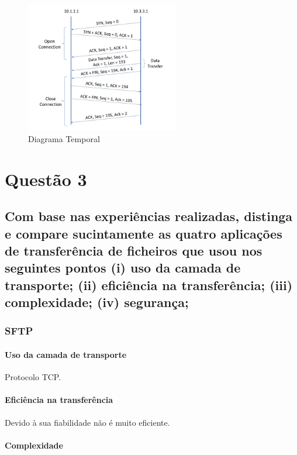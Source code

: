 \documentclass[a4paper]{report}
\begin{document}
\begin{figure}[H]
    \centering 
    \includegraphics[width=0.6\textwidth]{images/diagrama.png}  
    \caption{Diagrama Temporal}
    \label{fig:diagrama2}
\end{figure}

\chapter{Questão 3}

\section{Com base nas experiências realizadas, distinga e compare sucintamente as quatro aplicações de transferência de ficheiros que
usou nos seguintes pontos (i) uso da camada de transporte; (ii) eficiência na transferência; (iii) complexidade; (iv) segurança;}

\subsection{SFTP}

\subsubsection{Uso da camada de transporte}

Protocolo TCP.

\subsubsection{Eficiência na transferência}

Devido à sua fiabilidade não é muito eficiente.

\subsubsection{Complexidade}
\end{document}

